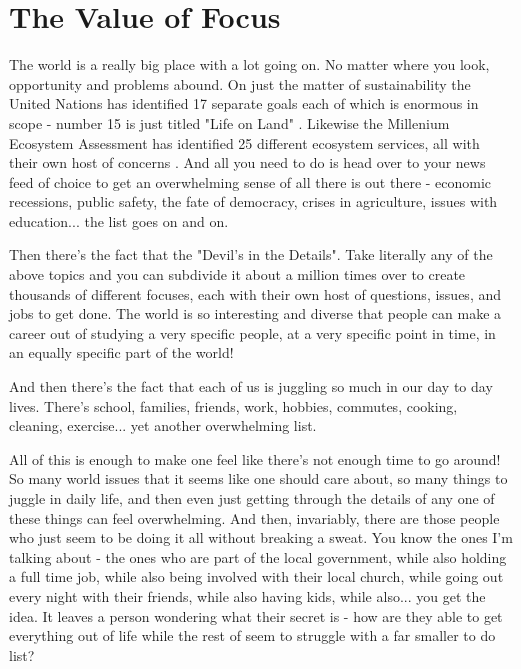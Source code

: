 \documentclass[11pt,a5paper]{book}
\begin{document}
\chapter{The Value of Focus}
The world is a really big place with a lot going on. No matter where you look, opportunity and problems abound. On just the matter of sustainability the United Nations has identified 17 separate goals each of which is enormous in scope - number 15 is just titled "Life on Land" \cite{united}. Likewise the Millenium Ecosystem Assessment has identified 25 different ecosystem services, all with their own host of concerns \cite{mas}. And all you need to do is head over to your news feed of choice to get an overwhelming sense of all there is out there - economic recessions, public safety, the fate of democracy, crises in agriculture, issues with education... the list goes on and on.
\newline

Then there's the fact that the "Devil's in the Details". Take literally any of the above topics and you can subdivide it about a million times over to create thousands of different focuses, each with their own host of questions, issues, and jobs to get done. The world is so interesting and diverse that people can make a career out of studying a very specific people, at a very specific point in time, in an equally specific part of the world! 
\newline

And then there's the fact that each of us is juggling so much in our day to day lives. There's school, families, friends, work, hobbies, commutes, cooking, cleaning, exercise... yet another overwhelming list. 
\newline

All of this is enough to make one feel like there's not enough time to go around! So many world issues that it seems like one should care about, so many things to juggle in daily life, and then even just getting through the details of any one of these things can feel overwhelming. And then, invariably, there are those people who just seem to be doing it all without breaking a sweat. You know the ones I'm talking about - the ones who are part of the local government, while also holding a full time job, while also being involved with their local church, while going out every night with their friends, while also having kids, while also... you get the idea. It leaves a person wondering what their secret is - how are they able to get everything out of life while the rest of seem to struggle with a far smaller to do list?
\newline
\end{document}
